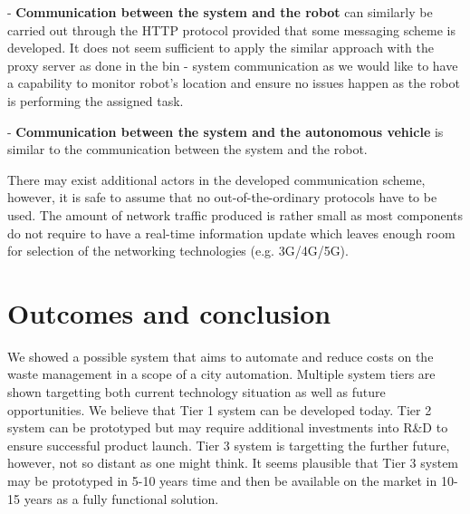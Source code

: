 \documentclass{article}
\begin{document}
- \textbf{Communication between the system and the robot} can similarly be carried out through the
HTTP protocol provided that some messaging scheme is developed. It does not seem sufficient to apply
the similar approach with the proxy server as done in the bin - system communication as we would
like to have a capability to monitor robot's location and ensure no issues happen as the robot is
performing the assigned task.

- \textbf{Communication between the system and the autonomous vehicle} is similar to the
communication between the system and the robot.

There may exist additional actors in the developed communication scheme, however, it is safe to
assume that no out-of-the-ordinary protocols have to be used. The amount of network traffic produced
is rather small as most components do not require to have a real-time information update which
leaves enough room for selection of the networking technologies (e.g. 3G/4G/5G).

\section{Outcomes and conclusion}

We showed a possible system that aims to automate and reduce costs on the waste management in a
scope of a city automation. Multiple system tiers are shown targetting both current technology
situation as well as future opportunities. We believe that Tier 1 system can be developed today.
Tier 2 system can be prototyped but may require additional investments into R\&D to ensure
successful product launch. Tier 3 system is targetting the further future, however, not so distant
as one might think. It seems plausible that Tier 3 system may be prototyped in 5-10 years time and
then be available on the market in 10-15 years as a fully functional solution.
\end{document}
